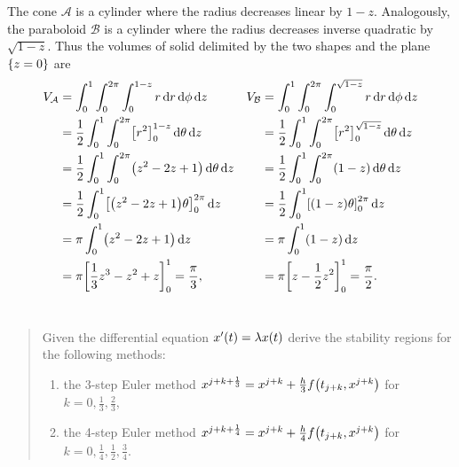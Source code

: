 \documentclass{exercise}
\begin{document}
	The cone \(\mathcal{A}\) is a cylinder where the radius decreases linear by \(1 - z\).
	Analogously, the paraboloid \(\mathcal{B}\) is a cylinder where the radius decreases inverse quadratic by \(\sqrt{1 - z}\).
	Thus the volumes of solid delimited by the two shapes and the plane \(\braces*{z = 0}\) are
	\begin{align*}
		V_{\mathcal{A}} &= \int_0^1 \int_0^{2\pi}\int_0^{1 - z}r\d r\d\phi\d z & V_{\mathcal{B}} &= \int_0^1 \int_0^{2\pi}\int_0^{\sqrt{1 - z}}r\d r\d\phi\d z\\
		&= \frac{1}{2}\int_0^1 \int_0^{2\pi} \brackets*{r^2}_0^{1 - z}\d\theta\d z & &= \frac{1}{2}\int_0^1 \int_0^{2\pi} \brackets*{r^2}_0^{\sqrt{1 - z}}\d\theta\d z\\
		&= \frac{1}{2}\int_0^1 \int_0^{2\pi} \parentheses*{z^2 - 2z + 1}\d\theta\d z & &= \frac{1}{2}\int_0^1 \int_0^{2\pi} \parentheses*{1 - z}\d\theta\d z\\
		&= \frac{1}{2}\int_0^1 \brackets*{\parentheses*{z^2 - 2z + 1}\theta}_0^{2\pi}\d z & &= \frac{1}{2}\int_0^1 \brackets*{\parentheses*{1 - z}\theta}_0^{2\pi}\d z\\
		&= \pi\int_0^1 \parentheses*{z^2 - 2z + 1}\d z & &= \pi\int_0^1 \parentheses*{1 - z}\d z\\
		&= \pi\brackets*{\frac{1}{3}z^3 - z^2 + z}_0^1 = \frac{\pi}{3}, & &= \pi\brackets*{z - \frac{1}{2}z^2}_0^1 = \frac{\pi}{2}.\\
	\end{align*}


	\section{}

	\begin{quote}
		Given the differential equation \(x'\parentheses*{t} = \lambda x\parentheses*{t}\) derive the stability regions for the following methods:
		\begin{enumerate}
			\item the 3-step Euler method \(x^{j + k + \frac{1}{3}} = x^{j + k} + \frac{h}{3}f\parentheses*{t_{j + k}, x^{j + k}}\) for \(k = 0, \frac{1}{3}, \frac{2}{3}\),
			\item the 4-step Euler method \(x^{j + k + \frac{1}{4}} = x^{j + k} + \frac{h}{4}f\parentheses*{t_{j + k}, x^{j + k}}\) for \(k = 0, \frac{1}{4}, \frac{1}{2}, \frac{3}{4}\).
		\end{enumerate}
	\end{quote}
\end{document}
